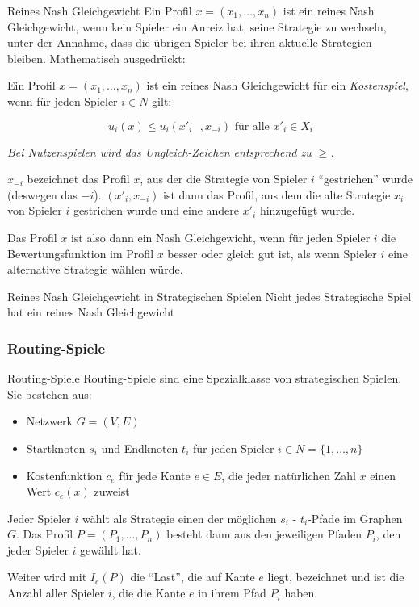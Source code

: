 \documentclass{panikzettel}
\begin{document}
\begin{defi}{Reines Nash Gleichgewicht}
	Ein Profil $x = (x_1, \dots, x_n)$ ist ein reines Nash Gleichgewicht, wenn kein Spieler ein Anreiz hat, seine Strategie zu wechseln, unter der Annahme, dass die übrigen Spieler bei ihren aktuelle Strategien bleiben. Mathematisch ausgedrückt:
	
	Ein Profil $x = (x_1, \dots, x_n)$ ist ein reines Nash Gleichgewicht für ein \emph{Kostenspiel}, wenn für jeden Spieler $i \in N$ gilt:


		\[ u_i(x) \leq u_i(x'_i \text{ }, x_{-i}) \text{ für alle } x'_i \in X_i \] 

\textit{Bei Nutzenspielen wird das Ungleich-Zeichen entsprechend zu $\geq$.}
	
	$x_{-i}$ bezeichnet das Profil $x$, aus der die Strategie von Spieler $i$ ``gestrichen'' wurde (deswegen das $-i$). $(x'_i, x_{-i})$ ist dann das Profil, aus dem die alte Strategie $x_i$ von Spieler $i$ gestrichen wurde und eine andere $x'_i$ hinzugefügt wurde. 
	
	Das Profil $x$ ist also dann ein Nash Gleichgewicht, wenn für jeden Spieler $i$ die Bewertungsfunktion im Profil $x$ besser oder gleich gut ist, als wenn Spieler $i$ eine alternative Strategie wählen würde.
\end{defi}

\begin{theo}{Reines Nash Gleichgewicht in Strategischen Spielen}
	Nicht jedes Strategische Spiel hat ein reines Nash Gleichgewicht
\end{theo}

\subsubsection{Routing-Spiele}

\begin{defi}{Routing-Spiele}
	Routing-Spiele sind eine Spezialklasse von strategischen Spielen. Sie bestehen aus:
	
	\begin{itemize}
		\item Netzwerk $G = (V,E)$
		\item Startknoten $s_i$ und Endknoten $t_i$ für jeden Spieler $i \in N = \{1, \dots, n\}$
		\item Kostenfunktion $c_e$ für jede Kante $e \in E$, die jeder natürlichen Zahl $x$ einen Wert $c_e(x)$ zuweist
	\end{itemize}

Jeder Spieler $i$ wählt als Strategie einen der möglichen $s_i$ - $t_i$-Pfade im Graphen $G$. Das Profil $P = (P_1, \dots, P_n)$ besteht dann aus den jeweiligen Pfaden $P_i$, den jeder Spieler $i$ gewählt hat.

Weiter wird mit $I_e(P)$ die ``Last'', die auf Kante $e$ liegt, bezeichnet und ist die Anzahl aller Spieler $i$, die die Kante $e$ in ihrem Pfad $P_i$ haben.
\end{defi}
\end{document}
